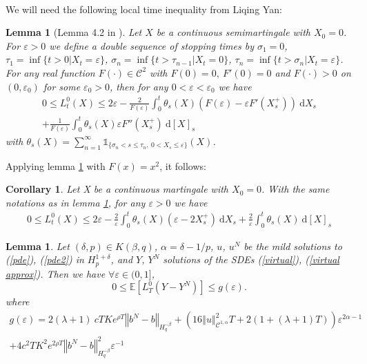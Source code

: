 \documentclass[12pt]{article}
\newtheorem{lem}[theo]{Lemma}
\newtheorem{cor}[theo]{Corollary}
\newcommand{\norme}[1]{\left\Vert #1\right\Vert}
\newcommand{\E}{\mathbb{E}}
\newcommand{\di}{\mathrm{d}}
\begin{document}
        \paragraph{}
        We will need the following local time inequality from Liqing Yan:        
        \begin{lem}[Lemma 4.2 in \cite{Yan}]\label{local}
            Let $X$ be a continuous semimartingale with $X_0 = 0$. For $\varepsilon>0$ we define a double sequence of stopping times by $\sigma_1 = 0$, $\tau_1=\inf\{t>0 | X_t=\varepsilon\}$, $\sigma_n = \inf\{t>\tau_{n-1}|X_t=0\}$, $\tau_n=\inf\{t>\sigma_n|X_t=\varepsilon\}$. For any real function $F(\cdot)\in\mathcal{C}^2$ with $F(0)=0,\ F'(0) = 0$ and $F(\cdot) > 0$ on $(0,\varepsilon_0)$ for some $\varepsilon_0 > 0$, then for any $0<\varepsilon<\varepsilon_0$ we have
            \begin{multline*}
                0\leq L^0_t(X) \leq 2\varepsilon - \frac{2}{F(\varepsilon)}\int_0^t \theta_s(X) \left(F\left(\varepsilon\right) - \varepsilon F'\left(X_s^+\right)\right)\ \di X_s\\
                +\frac{1}{F(\varepsilon)}\int_0^t \theta_s(X)\varepsilon F''(X_s^+)\ \di[X]_s
            \end{multline*}
            with $\theta_s(X) = \sum_{n=1}^\infty \mathds{1}_{\{\sigma_n< s\leq \tau_n,\ 0<X_s\leq \varepsilon\}}(X)$.
        \end{lem}        
        Applying lemma \ref{local} with $F(x) = x^2$, it follows:
        \begin{cor}\label{cor}
            Let X be a continuous martingale with $X_0 = 0$. With the same notations as in lemma \ref{local}, for any $\varepsilon>0$ we have
            \begin{multline}
                0\leq L^0_t(X) \leq 2\varepsilon - \frac{2}{\varepsilon}\int_0^t \theta_s(X) \left(\varepsilon - 2{X_s^+}\right)\ \di X_s
                +\frac{2}{\varepsilon}\int_0^t \theta_s(X) \ \di[X]_s
            \end{multline}
        \end{cor}

\begin{lem}\label{local time}
    Let $(\delta,p)\in K(\beta,q)$, $\alpha=\delta-1/p$, $u$, $u^N$ be the mild solutions to (\ref{pde}), (\ref{pde2}) in $H_p^{1+\delta}$, and $Y$, $Y^N$ solutions of the SDEs (\ref{virtual}), (\ref{virtual approx}).  Then we have $\forall\varepsilon\in(0,1]$,
    \begin{equation*}
    0\leq \E\left[L^0_T(Y-Y^N)\right]\leq  g(\varepsilon).
    \end{equation*}
    where \begin{multline*}
    g(\varepsilon) = 2(\lambda + 1)\ cT Ke^{\rho T}\norme{b^N-b}_{H^{-\beta}_{q}} + \left(16\norme{u}_{\mathcal{C}^{1,\alpha}}^2 T + 2(1+(\lambda + 1)T)\right) \varepsilon^{2\alpha-1}\\
    + 4c^2T K^2e^{2\rho T}\norme{b^N-b}_{H^{-\beta}_{q}}^2\varepsilon^{-1}
    \end{multline*}
\end{lem}
\end{document}

